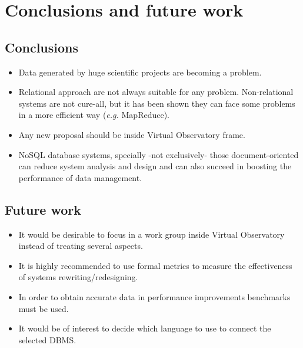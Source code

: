 \chapter{Conclusions and future work}


\section{Conclusions}

\begin{itemize}

\item Data generated by huge scientific projects are becoming a problem.

\item Relational approach are not always suitable for any problem. Non-relational systems are not cure-all, but it has been shown they can face some problems in a more efficient way (\textit{e.g.} MapReduce).

\item Any new proposal should be inside Virtual Observatory frame.

\item NoSQL database systems, specially -not exclusively- those document-oriented can reduce system analysis and design and can also succeed in boosting the performance of data management.

\end{itemize}

\section{Future work}

\begin{itemize}

\item It would be desirable to focus in a work group inside Virtual Observatory instead of treating several aspects.

\item It is highly recommended to use formal metrics to measure the effectiveness of systems rewriting/redesigning.

\item In order to obtain accurate data in performance improvements benchmarks must be used.

\item It would be of interest to decide which language to use to connect the selected DBMS.

\end{itemize}

